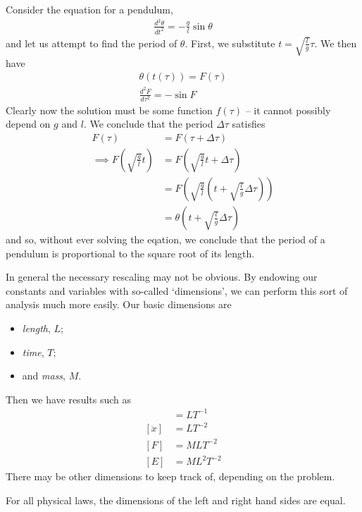 \documentclass{../../template/note}
\begin{document}
    Consider the equation for a pendulum,
    \begin{align*}
        \frac{d^2\theta}{dt^2} = -\frac g l \sin \theta
    \end{align*}
    and let us attempt to find the period of \(\theta\). First, we substitute \(t = \sqrt{\frac l g} \tau\). We then have
    \begin{align*}
        \theta(t(\tau)) = F(\tau) \\
        \frac{d^2F}{d\tau^2} = -\sin F
    \end{align*}
    Clearly now the solution must be some function \(f(\tau)\) -- it cannot possibly depend on \(g\) and \(l\). We conclude that the period \(\Delta \tau\) satisfies
    \begin{align*}
        F(\tau) &= F(\tau + \Delta \tau) \\
        \implies F\left(\sqrt{\frac g l} t\right) &= F\left(\sqrt{\frac g l} t + \Delta \tau\right) \\
        &= F\left(\sqrt{\frac g l}\left(t + \sqrt{\frac l g} \Delta \tau\right)\right) \\
        &= \theta\left(t + \sqrt{\frac l g }\Delta \tau\right)
    \end{align*}
    and so, without ever solving the eqation, we conclude that the period of a pendulum is proportional to the square root of its length.

    In general the necessary rescaling may not be obvious. By endowing our constants and variables with so-called `dimensions', we can perform this sort of analysis much more easily. Our basic dimensions are
    \begin{itemize}
        \item \emph{length}, \(L\);
        \item \emph{time}, \(T\);
        \item and \emph{mass}, \(M\).
    \end{itemize}
    Then we have results such as
    \begin{align*}
        [\dot x] &= \si{LT^{-1}} \\
        [\ddot x] &= \si{LT^{-2}} \\
        [F] &= \si{MLT^{-2}} \\
        [E] &= \si{ML^2T^{-2}}
    \end{align*}
    There may be other dimensions to keep track of, depending on the problem.

    \begin{theorem}
        For all physical laws, the dimensions of the left and right hand sides are equal.
    \end{theorem}
\end{document}
